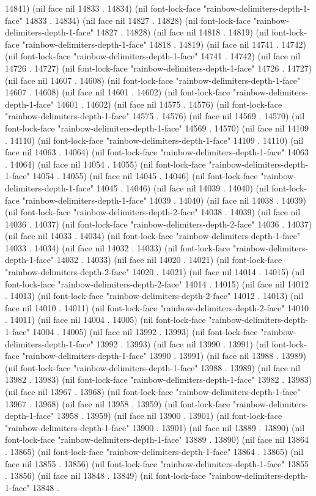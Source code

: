 14841) (nil face nil 14833 . 14834) (nil font-lock-face "rainbow-delimiters-depth-1-face" 14833 . 14834) (nil face nil 14827 . 14828) (nil font-lock-face "rainbow-delimiters-depth-1-face" 14827 . 14828) (nil face nil 14818 . 14819) (nil font-lock-face "rainbow-delimiters-depth-1-face" 14818 . 14819) (nil face nil 14741 . 14742) (nil font-lock-face "rainbow-delimiters-depth-1-face" 14741 . 14742) (nil face nil 14726 . 14727) (nil font-lock-face "rainbow-delimiters-depth-1-face" 14726 . 14727) (nil face nil 14607 . 14608) (nil font-lock-face "rainbow-delimiters-depth-1-face" 14607 . 14608) (nil face nil 14601 . 14602) (nil font-lock-face "rainbow-delimiters-depth-1-face" 14601 . 14602) (nil face nil 14575 . 14576) (nil font-lock-face "rainbow-delimiters-depth-1-face" 14575 . 14576) (nil face nil 14569 . 14570) (nil font-lock-face "rainbow-delimiters-depth-1-face" 14569 . 14570) (nil face nil 14109 . 14110) (nil font-lock-face "rainbow-delimiters-depth-1-face" 14109 . 14110) (nil face nil 14063 . 14064) (nil font-lock-face "rainbow-delimiters-depth-1-face" 14063 . 14064) (nil face nil 14054 . 14055) (nil font-lock-face "rainbow-delimiters-depth-1-face" 14054 . 14055) (nil face nil 14045 . 14046) (nil font-lock-face "rainbow-delimiters-depth-1-face" 14045 . 14046) (nil face nil 14039 . 14040) (nil font-lock-face "rainbow-delimiters-depth-1-face" 14039 . 14040) (nil face nil 14038 . 14039) (nil font-lock-face "rainbow-delimiters-depth-2-face" 14038 . 14039) (nil face nil 14036 . 14037) (nil font-lock-face "rainbow-delimiters-depth-2-face" 14036 . 14037) (nil face nil 14033 . 14034) (nil font-lock-face "rainbow-delimiters-depth-1-face" 14033 . 14034) (nil face nil 14032 . 14033) (nil font-lock-face "rainbow-delimiters-depth-1-face" 14032 . 14033) (nil face nil 14020 . 14021) (nil font-lock-face "rainbow-delimiters-depth-2-face" 14020 . 14021) (nil face nil 14014 . 14015) (nil font-lock-face "rainbow-delimiters-depth-2-face" 14014 . 14015) (nil face nil 14012 . 14013) (nil font-lock-face "rainbow-delimiters-depth-2-face" 14012 . 14013) (nil face nil 14010 . 14011) (nil font-lock-face "rainbow-delimiters-depth-2-face" 14010 . 14011) (nil face nil 14004 . 14005) (nil font-lock-face "rainbow-delimiters-depth-1-face" 14004 . 14005) (nil face nil 13992 . 13993) (nil font-lock-face "rainbow-delimiters-depth-1-face" 13992 . 13993) (nil face nil 13990 . 13991) (nil font-lock-face "rainbow-delimiters-depth-1-face" 13990 . 13991) (nil face nil 13988 . 13989) (nil font-lock-face "rainbow-delimiters-depth-1-face" 13988 . 13989) (nil face nil 13982 . 13983) (nil font-lock-face "rainbow-delimiters-depth-1-face" 13982 . 13983) (nil face nil 13967 . 13968) (nil font-lock-face "rainbow-delimiters-depth-1-face" 13967 . 13968) (nil face nil 13958 . 13959) (nil font-lock-face "rainbow-delimiters-depth-1-face" 13958 . 13959) (nil face nil 13900 . 13901) (nil font-lock-face "rainbow-delimiters-depth-1-face" 13900 . 13901) (nil face nil 13889 . 13890) (nil font-lock-face "rainbow-delimiters-depth-1-face" 13889 . 13890) (nil face nil 13864 . 13865) (nil font-lock-face "rainbow-delimiters-depth-1-face" 13864 . 13865) (nil face nil 13855 . 13856) (nil font-lock-face "rainbow-delimiters-depth-1-face" 13855 . 13856) (nil face nil 13848 . 13849) (nil font-lock-face "rainbow-delimiters-depth-1-face" 13848 . 